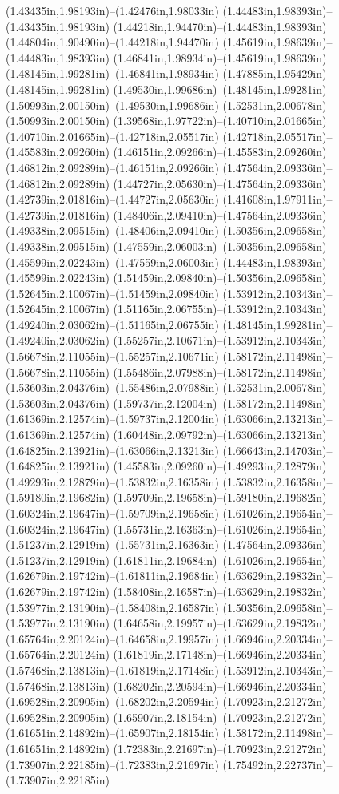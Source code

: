 (1.43435in,1.98193in)--(1.42476in,1.98033in) (1.44483in,1.98393in)--(1.43435in,1.98193in) (1.44218in,1.94470in)--(1.44483in,1.98393in) (1.44804in,1.90490in)--(1.44218in,1.94470in) (1.45619in,1.98639in)--(1.44483in,1.98393in) (1.46841in,1.98934in)--(1.45619in,1.98639in) (1.48145in,1.99281in)--(1.46841in,1.98934in) (1.47885in,1.95429in)--(1.48145in,1.99281in) (1.49530in,1.99686in)--(1.48145in,1.99281in) (1.50993in,2.00150in)--(1.49530in,1.99686in) (1.52531in,2.00678in)--(1.50993in,2.00150in) (1.39568in,1.97722in)--(1.40710in,2.01665in) (1.40710in,2.01665in)--(1.42718in,2.05517in) (1.42718in,2.05517in)--(1.45583in,2.09260in) (1.46151in,2.09266in)--(1.45583in,2.09260in) (1.46812in,2.09289in)--(1.46151in,2.09266in) (1.47564in,2.09336in)--(1.46812in,2.09289in) (1.44727in,2.05630in)--(1.47564in,2.09336in) (1.42739in,2.01816in)--(1.44727in,2.05630in) (1.41608in,1.97911in)--(1.42739in,2.01816in) (1.48406in,2.09410in)--(1.47564in,2.09336in) (1.49338in,2.09515in)--(1.48406in,2.09410in) (1.50356in,2.09658in)--(1.49338in,2.09515in) (1.47559in,2.06003in)--(1.50356in,2.09658in) (1.45599in,2.02243in)--(1.47559in,2.06003in) (1.44483in,1.98393in)--(1.45599in,2.02243in) (1.51459in,2.09840in)--(1.50356in,2.09658in) (1.52645in,2.10067in)--(1.51459in,2.09840in) (1.53912in,2.10343in)--(1.52645in,2.10067in) (1.51165in,2.06755in)--(1.53912in,2.10343in) (1.49240in,2.03062in)--(1.51165in,2.06755in) (1.48145in,1.99281in)--(1.49240in,2.03062in) (1.55257in,2.10671in)--(1.53912in,2.10343in) (1.56678in,2.11055in)--(1.55257in,2.10671in) (1.58172in,2.11498in)--(1.56678in,2.11055in) (1.55486in,2.07988in)--(1.58172in,2.11498in) (1.53603in,2.04376in)--(1.55486in,2.07988in) (1.52531in,2.00678in)--(1.53603in,2.04376in) (1.59737in,2.12004in)--(1.58172in,2.11498in) (1.61369in,2.12574in)--(1.59737in,2.12004in) (1.63066in,2.13213in)--(1.61369in,2.12574in) (1.60448in,2.09792in)--(1.63066in,2.13213in) (1.64825in,2.13921in)--(1.63066in,2.13213in) (1.66643in,2.14703in)--(1.64825in,2.13921in) (1.45583in,2.09260in)--(1.49293in,2.12879in) (1.49293in,2.12879in)--(1.53832in,2.16358in) (1.53832in,2.16358in)--(1.59180in,2.19682in) (1.59709in,2.19658in)--(1.59180in,2.19682in) (1.60324in,2.19647in)--(1.59709in,2.19658in) (1.61026in,2.19654in)--(1.60324in,2.19647in) (1.55731in,2.16363in)--(1.61026in,2.19654in) (1.51237in,2.12919in)--(1.55731in,2.16363in) (1.47564in,2.09336in)--(1.51237in,2.12919in) (1.61811in,2.19684in)--(1.61026in,2.19654in) (1.62679in,2.19742in)--(1.61811in,2.19684in) (1.63629in,2.19832in)--(1.62679in,2.19742in) (1.58408in,2.16587in)--(1.63629in,2.19832in) (1.53977in,2.13190in)--(1.58408in,2.16587in) (1.50356in,2.09658in)--(1.53977in,2.13190in) (1.64658in,2.19957in)--(1.63629in,2.19832in) (1.65764in,2.20124in)--(1.64658in,2.19957in) (1.66946in,2.20334in)--(1.65764in,2.20124in) (1.61819in,2.17148in)--(1.66946in,2.20334in) (1.57468in,2.13813in)--(1.61819in,2.17148in) (1.53912in,2.10343in)--(1.57468in,2.13813in) (1.68202in,2.20594in)--(1.66946in,2.20334in) (1.69528in,2.20905in)--(1.68202in,2.20594in) (1.70923in,2.21272in)--(1.69528in,2.20905in) (1.65907in,2.18154in)--(1.70923in,2.21272in) (1.61651in,2.14892in)--(1.65907in,2.18154in) (1.58172in,2.11498in)--(1.61651in,2.14892in) (1.72383in,2.21697in)--(1.70923in,2.21272in) (1.73907in,2.22185in)--(1.72383in,2.21697in) (1.75492in,2.22737in)--(1.73907in,2.22185in) 
